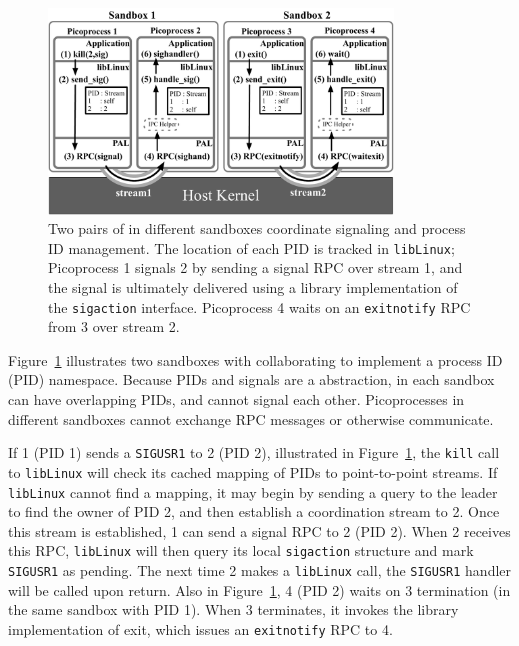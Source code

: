\begin{figure}
\centering
\includegraphics[width=3.6in]{graphene/figures/coordination.pdf}
\caption[\sysname{}: sandboxing inter-process cordination]
{Two pairs of \sysname{} \picoprocs{} in different sandboxes 
coordinate signaling and process ID management.
The location of each PID is tracked in {\tt libLinux}; Picoprocess 1 signals
\picoproc{} 2 by sending a signal RPC over stream 1,
and the signal is ultimately delivered using a 
library implementation of the {\tt sigaction} interface. Picoprocess 4 
waits on an {\tt exitnotify} RPC from  \picoproc{} 3 over stream 2. }
\label{fig:graphene:coordination}
\end{figure}

Figure~\ref{fig:graphene:coordination} illustrates two sandboxes with \picoprocs{}
collaborating to implement a process ID (PID) namespace.  
Because PIDs and signals are a \libos{} abstraction,
\picoprocs{} in 
each sandbox can have overlapping PIDs, and
cannot signal each other.
Picoprocesses in different sandboxes cannot 
exchange RPC messages or otherwise communicate.


If \picoproc{} 1 (PID 1) sends a {\tt SIGUSR1} to \picoproc{} 2 (PID 2), illustrated in Figure~\ref{fig:graphene:coordination},
the {\tt kill} call to {\tt libLinux} will check its cached mapping of PIDs to 
point-to-point streams.
If {\tt libLinux} cannot find a mapping, it may begin by sending a query to the leader
to find the owner of PID 2,
and then establish a coordination stream to \picoproc{} 2.
Once this stream is established, \picoproc{} 1 can send a  
signal RPC to \picoproc{} 2 (PID 2).
When \picoproc{} 2 receives this RPC, 
{\tt libLinux} will then query its local {\tt sigaction} 
structure and mark {\tt SIGUSR1} as pending.
The next time \picoproc{} 2 makes a {\tt libLinux} call,
the {\tt SIGUSR1} handler will be called upon return. Also in Figure~\ref{fig:graphene:coordination}, \picoproc{} 4 (PID 2) waits on 
\picoproc{} 3 termination (in the same sandbox with PID 1). When \picoproc{} 3 terminates, it invokes the library implementation of exit, which issues
an {\tt exitnotify} RPC to \picoproc{} 4.

